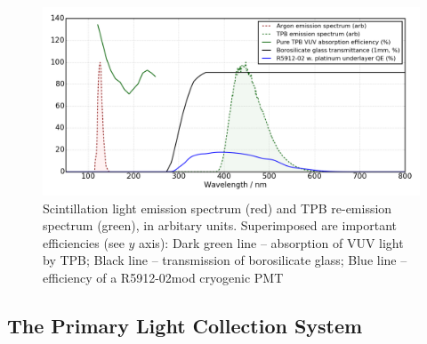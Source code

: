 \begin{figure}
	\centering 
\includegraphics[width=\textwidth]{./figures/pmttpbeff.png} 
        \caption{Scintillation light emission spectrum (red) and TPB re-emission spectrum (green), in arbitary units.  Superimposed are important efficiencies (see $y$ axis):  Dark green line -- absorption of VUV light by TPB;  Black line -- transmission of borosilicate glass;  Blue line -- efficiency of a R5912-02mod cryogenic PMT \cite{Jones:2015bya} }\label{fig:lightchallenge}
\end{figure}





\subsection{The Primary Light Collection System}

